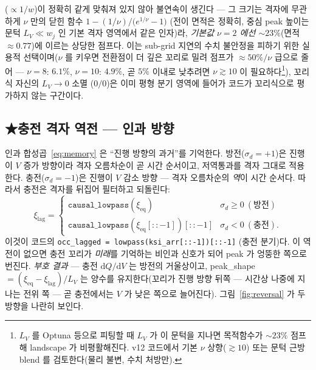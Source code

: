 \documentclass[11pt,a4paper]{article}
\newcommand{\dd}{\mathrm{d}}
\newcommand{\eq}{\mathrm{eq}}
\newcommand{\code}[1]{\texttt{#1}}
\begin{document}
($\propto 1/w$)이 정확히 같게 맞춰져 있지 않아 불연속이 생긴다 — 그 크기는 격자에 무관하게 $\nu$ 만의 닫힌 함수
$1-(1/\nu)\big/\!\big(e^{1/\nu}-1\big)$ (전이 면적은 정확히, 중심 peak 높이는 문턱 $L_V\!\ll\!w_j$ 인 기본 격자 영역에서 같은 인자)라, \emph{기본값 $\nu=2$ 에선 $\sim23\%$}(면적 $\approx0.77$)에 이르는 상당한 점프다.
이는 sub-grid 지연의 수치 불안정을 피하기 위한 실용적 선택이며($\nu$ 를 키우면
전환점이 더 깊은 꼬리로 밀려 점프가 $\approx50\%/\nu$ 급으로 줄어 — $\nu{=}8$: $6.1\%$, $\nu{=}10$: $4.9\%$, 곧 $5\%$ 이내로 낮추려면 $\nu\!\gtrsim\!10$ 이
필요하다\footnote{$L_V$ 를 Optuna 등으로 피팅할 때 $L_V$ 가 이 문턱을 지나면 목적함수가 $\sim23\%$ 점프해 landscape 가
비평활해진다. v12 코드에서 기본 $\nu$ 상향($\gtrsim10$) 또는 문턱 근방 blend 를 검토한다(물리 불변, 수치 처방만).}), 꼬리식 자신의 $L_V\to0$ 소멸
($0/0$)은 이미 평형 분기 영역에 들어가 코드가 꼬리식으로 평가하지 않는 구간이다.

\subsection{★충전 격자 역전 — 인과 방향}
인과 합성곱~\eqref{eq:memory} 은 ``진행 방향의 과거''를 기억한다. 방전($\sigma_d=+1$)은 진행이 $V$ 증가 방향이라 격자
오름차순이 곧 시간 순서이고, 저역통과를 격자 그대로 적용한다. 충전($\sigma_d=-1$)은 진행이 $V$ 감소 방향 — 격자
오름차순의 \emph{역}이 시간 순서다. 따라서 충전은 격자를 뒤집어 필터하고 되돌린다:
\begin{equation}
\xi_\mathrm{lag}=
\begin{cases}
\code{causal\_lowpass}(\xi_\eq) & \sigma_d\ge0\ (\text{방전})\\[2pt]
\code{causal\_lowpass}(\xi_\eq[::-1])[::-1] & \sigma_d<0\ (\text{충전}).
\end{cases}
\label{eq:reversal}
\end{equation}
이것이 코드의 \code{occ\_lagged = lowpass(ksi\_arr[::-1])[::-1]} (충전 분기)다. 이 역전이 없으면 충전 꼬리가
\emph{미래}를 기억하는 비인과 신호가 되어 peak 가 엉뚱한 쪽으로 번진다. \emph{부호 결과} — 충전 $\dd Q/\dd V$ 는 방전의
거울상이고, peak\_shape $=(\xi_\eq-\xi_\mathrm{lag})/L_V$ 는 양수를 유지한다(꼬리가 진행 방향 뒤쪽 —
시간상 나중에 지나는 전위 쪽 — 곧 충전에서는 $V$ 가 낮은 쪽으로 늘어진다). 그림~\ref{fig:reversal} 가 두 방향을 나란히 보인다.
\end{document}
